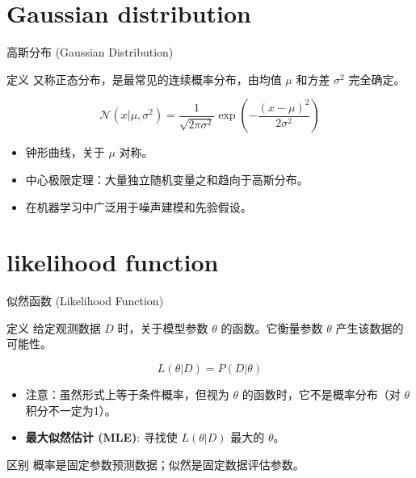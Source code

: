 \documentclass[12pt, t, aspectratio=169]{beamer}
\begin{document}
\section{Gaussian distribution}
\begin{frame}{高斯分布 (Gaussian Distribution)}
    \begin{block}{定义}
        又称正态分布，是最常见的连续概率分布，由均值 $\mu$ 和方差 $\sigma^2$ 完全确定。
    \end{block}
    
    \begin{equation*}
        \mathcal{N}(x|\mu, \sigma^2) = \frac{1}{\sqrt{2\pi\sigma^2}} \exp\left(-\frac{(x-\mu)^2}{2\sigma^2}\right)
    \end{equation*}
    
    \vspace{0.5cm}
    \begin{itemize}
        \item 钟形曲线，关于 $\mu$ 对称。
        \item 中心极限定理：大量独立随机变量之和趋向于高斯分布。
        \item 在机器学习中广泛用于噪声建模和先验假设。
    \end{itemize}
\end{frame}

\section{likelihood function}
\begin{frame}{似然函数 (Likelihood Function)}
    \begin{block}{定义}
        给定观测数据 $D$ 时，关于模型参数 $\theta$ 的函数。它衡量参数 $\theta$ 产生该数据的可能性。
    \end{block}
    
    \begin{equation*}
        L(\theta|D) = P(D|\theta)
    \end{equation*}
    
    \vspace{0.1cm}
    \begin{itemize}
        \item 注意：虽然形式上等于条件概率，但视为 $\theta$ 的函数时，它不是概率分布（对 $\theta$ 积分不一定为1）。
        \item \textbf{最大似然估计 (MLE)}: 寻找使 $L(\theta|D)$ 最大的 $\theta$。
    \end{itemize}
    
    \begin{alertblock}{区别}
        概率是固定参数预测数据；似然是固定数据评估参数。
    \end{alertblock}
\end{frame}
\end{document}
